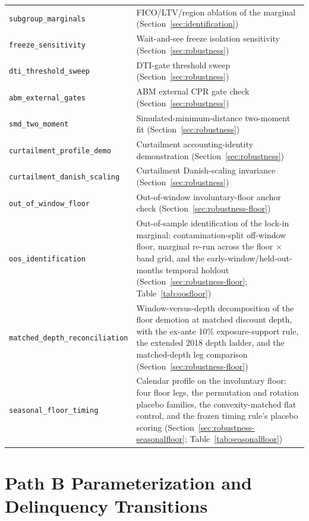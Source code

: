 \documentclass[12pt]{article}
\begin{document}
\begin{table}[H]
\begin{threeparttable}
\begin{tabular}{@{}p{5.4cm}p{8.8cm}@{}}
\texttt{subgroup\_marginals} & FICO/LTV/region ablation of the marginal (Section~\ref{sec:identification}) \\
\texttt{freeze\_sensitivity} & Wait-and-see freeze isolation sensitivity (Section~\ref{sec:robustness}) \\
\texttt{dti\_threshold\_sweep} & DTI-gate threshold sweep (Section~\ref{sec:robustness}) \\
\texttt{abm\_external\_gates} & ABM external CPR gate check (Section~\ref{sec:robustness}) \\
\texttt{smd\_two\_moment} & Simulated-minimum-distance two-moment fit (Section~\ref{sec:robustness}) \\
\texttt{curtailment\_profile\_demo} & Curtailment accounting-identity demonstration (Section~\ref{sec:robustness}) \\
\texttt{curtailment\_danish\_scaling} & Curtailment Danish-scaling invariance (Section~\ref{sec:robustness}) \\
\texttt{out\_of\_window\_floor} & Out-of-window involuntary-floor anchor check (Section~\ref{sec:robustness-floor}) \\
\texttt{oos\_identification} & Out-of-sample identification of the lock-in marginal: contamination-split off-window floor, marginal re-run across the floor $\times$ band grid, and the early-window/held-out-months temporal holdout (Section~\ref{sec:robustness-floor}; Table~\ref{tab:oosfloor}) \\
\texttt{matched\_depth\_reconciliation} & Window-versus-depth decomposition of the floor demotion at matched discount depth, with the ex-ante 10\% exposure-support rule, the extended 2018 depth ladder, and the matched-depth leg comparison (Section~\ref{sec:robustness-floor}) \\
\texttt{seasonal\_floor\_timing} & Calendar profile on the involuntary floor: four floor legs, the permutation and rotation placebo families, the convexity-matched flat control, and the frozen timing rule's placebo scoring (Section~\ref{sec:robustness-seasonalfloor}; Table~\ref{tab:seasonalfloor}) \\
\bottomrule
\end{tabular}
\end{threeparttable}
\end{table}

\section{Path B Parameterization and Delinquency Transitions}\label{app:params}
\end{document}
